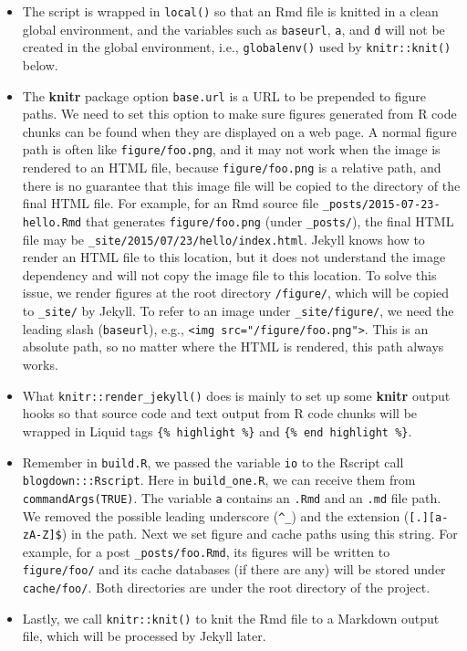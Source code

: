 \documentclass[12pt,]{krantz}
\theoremstyle{definition}
\theoremstyle{definition}
\theoremstyle{definition}
\theoremstyle{remark}
\begin{document}
\begin{itemize}
\item
  The script is wrapped in \texttt{local()} so that an Rmd file is
  knitted in a clean global environment, and the variables such as
  \texttt{baseurl}, \texttt{a}, and \texttt{d} will not be created in
  the global environment, i.e., \texttt{globalenv()} used by
  \texttt{knitr::knit()} below.
\item
  The \textbf{knitr} package option \texttt{base.url} is a URL to be
  prepended to figure paths. We need to set this option to make sure
  figures generated from R code chunks can be found when they are
  displayed on a web page. A normal figure path is often like
  \texttt{figure/foo.png}, and it may not work when the image is
  rendered to an HTML file, because \texttt{figure/foo.png} is a
  relative path, and there is no guarantee that this image file will be
  copied to the directory of the final HTML file. For example, for an
  Rmd source file \texttt{\_posts/2015-07-23-hello.Rmd} that generates
  \texttt{figure/foo.png} (under \texttt{\_posts/}), the final HTML file
  may be \texttt{\_site/2015/07/23/hello/index.html}. Jekyll knows how
  to render an HTML file to this location, but it does not understand
  the image dependency and will not copy the image file to this
  location. To solve this issue, we render figures at the root directory
  \texttt{/figure/}, which will be copied to \texttt{\_site/} by Jekyll.
  To refer to an image under \texttt{\_site/figure/}, we need the
  leading slash (\texttt{baseurl}), e.g.,
  \texttt{\textless{}img\ src="/figure/foo.png"\textgreater{}}. This is
  an absolute path, so no matter where the HTML is rendered, this path
  always works.
\item
  What \texttt{knitr::render\_jekyll()}
  does is mainly to set up some
  \textbf{knitr} output hooks so that source code and text output from R
  code chunks will be wrapped in Liquid tags
  \texttt{\{\%\ highlight\ \%\}} and
  \texttt{\{\%\ end\ highlight\ \%\}}.
\item
  Remember in \texttt{build.R}, we passed the variable \texttt{io} to
  the Rscript call \texttt{blogdown:::Rscript}. Here in
  \texttt{build\_one.R}, we can receive them from
  \texttt{commandArgs(TRUE)}. The variable \texttt{a} contains an
  \texttt{.Rmd} and an \texttt{.md} file path. We removed the possible
  leading underscore (\texttt{\^{}\_}) and the extension
  (\texttt{{[}.{]}{[}a-zA-Z{]}\$}) in the path. Next we set figure and
  cache paths using this string. For example, for a post
  \texttt{\_posts/foo.Rmd}, its figures will be written to
  \texttt{figure/foo/} and its cache databases (if there are any) will
  be stored under \texttt{cache/foo/}. Both directories are under the
  root directory of the project.
\item
  Lastly, we call \texttt{knitr::knit()} to knit the Rmd file to a
  Markdown output file, which will be processed by Jekyll later.
\end{itemize}
\end{document}
